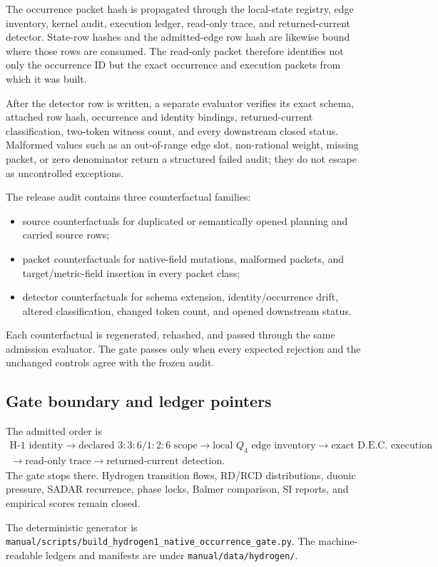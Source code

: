 The occurrence packet hash is propagated through the local-state registry,
edge inventory, kernel audit, execution ledger, read-only trace, and returned-current
detector.  State-row hashes and the admitted-edge row hash are likewise bound
where those rows are consumed.  The read-only packet therefore identifies not
only the occurrence ID but the exact occurrence and execution packets from
which it was built.

After the detector row is written, a separate evaluator verifies its exact
schema, attached row hash, occurrence and identity bindings, returned-current
classification, two-token witness count, and every downstream closed status.
Malformed values such as an out-of-range edge slot, non-rational weight,
missing packet, or zero denominator return a structured failed audit; they do
not escape as uncontrolled exceptions.

The release audit contains three counterfactual families:
\begin{itemize}
  \item source counterfactuals for duplicated or semantically opened planning
        and carried source rows;
  \item packet counterfactuals for native-field mutations, malformed packets,
        and target/metric-field insertion in every packet class;
  \item detector counterfactuals for schema extension, identity/occurrence
        drift, altered classification, changed token count, and opened
        downstream status.
\end{itemize}
Each counterfactual is regenerated, rehashed, and passed through the same
admission evaluator.  The gate passes only when every expected rejection and
the unchanged controls agree with the frozen audit.

\subsection{Gate boundary and ledger pointers}

The admitted order is
\[
\begin{gathered}
\text{H-1 identity}
\to
\text{declared }3{:}3{:}6/1{:}2{:}6\text{ scope}
\to
\text{local }Q_4\text{ edge inventory}
\to
\text{exact D.E.C. execution}
\\
\to
\text{read-only trace}
\to
\text{returned-current detection}.
\end{gathered}
\]
The gate stops there.  Hydrogen transition flows, RD/RCD distributions,
duonic pressure, SADAR recurrence, phase locks, Balmer comparison, SI reports,
and empirical scores remain closed.

The deterministic generator is
\texttt{manual/scripts/build\_hydrogen1\_native\_occurrence\_gate.py}.
The machine-readable ledgers and manifests are under
\texttt{manual/data/hydrogen/}.
